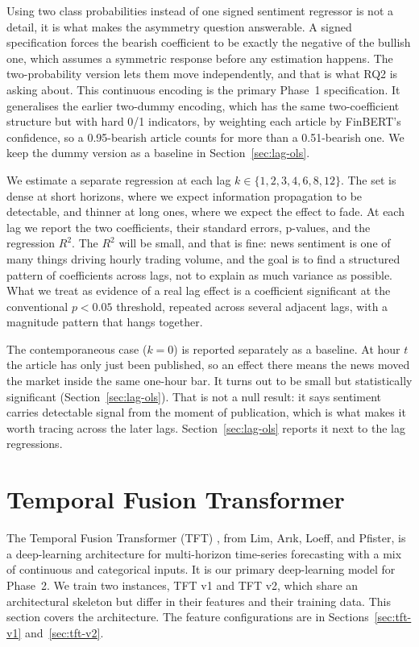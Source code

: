 Using two class probabilities instead of one signed sentiment regressor is not a detail, it is what makes the asymmetry question answerable. A signed specification forces the bearish coefficient to be exactly the negative of the bullish one, which assumes a symmetric response before any estimation happens. The two-probability version lets them move independently, and that is what RQ2 is asking about. This continuous encoding is the primary Phase~1 specification. It generalises the earlier two-dummy encoding, which has the same two-coefficient structure but with hard 0/1 indicators, by weighting each article by FinBERT's confidence, so a 0.95-bearish article counts for more than a 0.51-bearish one. We keep the dummy version as a baseline in Section~\ref{sec:lag-ols}.

We estimate a separate regression at each lag $k \in \{1, 2, 3, 4, 6, 8, 12\}$. The set is dense at short horizons, where we expect information propagation to be detectable, and thinner at long ones, where we expect the effect to fade. At each lag we report the two coefficients, their standard errors, p-values, and the regression $R^2$. The $R^2$ will be small, and that is fine: news sentiment is one of many things driving hourly trading volume, and the goal is to find a structured pattern of coefficients across lags, not to explain as much variance as possible. What we treat as evidence of a real lag effect is a coefficient significant at the conventional $p < 0.05$ threshold, repeated across several adjacent lags, with a magnitude pattern that hangs together.

The contemporaneous case ($k = 0$) is reported separately as a baseline. At hour $t$ the article has only just been published, so an effect there means the news moved the market inside the same one-hour bar. It turns out to be small but statistically significant (Section~\ref{sec:lag-ols}). That is not a null result: it says sentiment carries detectable signal from the moment of publication, which is what makes it worth tracing across the later lags. Section~\ref{sec:lag-ols} reports it next to the lag regressions.

\section{Temporal Fusion Transformer}\label{sec:tft-methods}

The Temporal Fusion Transformer (TFT) \citep{lim2021}, from Lim, Ar\i k, Loeff, and Pfister, is a deep-learning architecture for multi-horizon time-series forecasting with a mix of continuous and categorical inputs. It is our primary deep-learning model for Phase~2. We train two instances, TFT v1 and TFT v2, which share an architectural skeleton but differ in their features and their training data. This section covers the architecture. The feature configurations are in Sections~\ref{sec:tft-v1} and~\ref{sec:tft-v2}.

